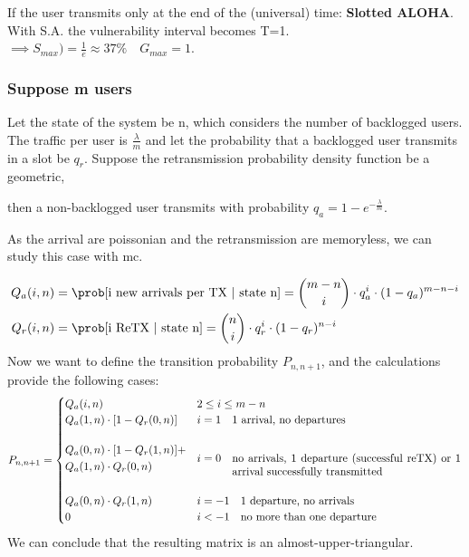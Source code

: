 If the user transmits only at the end of the (universal) time: \textbf{Slotted ALOHA}.
With S.A. the vulnerability interval becomes T=1. $\implies S_{max})=\frac{1}{e} \approx 37\% \quad G_{max} = 1$.

\subsubsection{Suppose m users}
Let the state of the system be n, which considers the number of backlogged users.
The traffic per user is $\frac{\lambda}{m}$ and let the probability that a backlogged
user transmits in a slot be $q_r$. Suppose the retransmission probability density function be a geometric,

then a non-backlogged user transmits with probability $q_a = 1-e^{-\frac{\lambda}{m}}$.

As the arrival are poissonian and the retransmission are memoryless, we can study this case with \gls{mc}.

\begin{equation}\begin{split}
  Q_a(i,n) &= \prob[\text{i new arrivals per TX | state n}] = \binom{m-n}{i} \cdot q_a^i \cdot (1-q_a)^{m-n-i} \\
  Q_r(i,n) &= \prob[\text{i ReTX | state n}] = \binom{n}{i} \cdot q_r^i \cdot (1-q_r)^{n-i} \\
\end{split}\end{equation}
Now we want to define the transition probability $P_{n,n+1}$, and the calculations provide the following cases:
\begin{equation}
  P_{n,n+1} = \begin{cases}
    Q_a(i,n) & 2 \le i \le m-n \\
    Q_a(1,n) \cdot [1-Q_r(0,n)] & i=1 \quad \text{1 arrival, no departures}\\\\
    \begin{aligned}
    & Q_a(0,n) \cdot [1-Q_r(1,n)] + \\ & Q_a(1,n)\cdot Q_r(0,n)
    \end{aligned}& i=0 \quad \parbox[t]{0.6\textwidth}{no arrivals, 1 departure (successful reTX) or 1 arrival successfully transmitted }\\\\
    Q_a(0,n)\cdot Q_r(1,n) & i = -1 \quad \text{1 departure, no arrivals}\\
    0 & i < -1 \quad \text{no more than one departure}
  \end{cases}
\end{equation}
We can conclude that the resulting matrix is an almost-upper-triangular.

